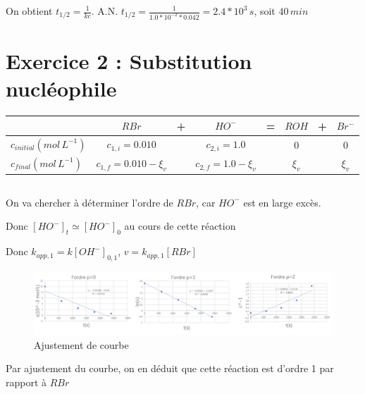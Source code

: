 \documentclass[a4paper,12pt]{book}
\begin{document}
On obtient $\boxed{t_{1/2}=\frac{1}{kc}}$. A.N. $\boxed{t_{1/2}=\frac{1}{1.0*10^{-2}*0.042}=2.4*10^3\,s}$, soit $40\,min$
\section{Exercice 2 : Substitution nucléophile}
\begin{table}[h]
    \begin{center}
        \begin{tabular}{l|ccccccc}
        \hline
                          & $RBr$      & + & $HO^{-}$       & = & $ROH$ & + & $Br^{-}$ \\ \hline
            $c_{initial}(mol\,L^{-1})$ & $c_{1,i}=0.010$       &   & $c_{2,i}=1.0$      &   & $0$ &  & $0$\\ 
            $c_{final}(mol\,L^{-1})$      & $c_{1,f}=0.010-\xi_v$  &   & $c_{2,f}=1.0-\xi_v$  &   & $\xi_v$ & & $\xi_v$\\ 
        \end{tabular}
    \end{center}
    \end{table}
\subsection{}
On va chercher à déterminer l’ordre de $RBr$, car $HO^{-}$ est en large excès.

\hspace*{\fill} 

Donc $[HO^{-}]_t\simeq [HO^{-}]_0$ au cours de cette réaction

\hspace*{\fill} 

Donc $\boxed{k_{app,1}=k[OH^{-}]_{0,1}}$, $v=k_{app,1}[RBr]$
\begin{figure}[h]
    \begin{center}
    \includegraphics[scale=0.45]{dm91.png}
    \end{center}
    \caption{Ajustement de courbe}
\end{figure}

\hspace*{\fill} 

Par ajustement du courbe, on en déduit que cette réaction est d'ordre 1 par rapport à $RBr$
\end{document}
